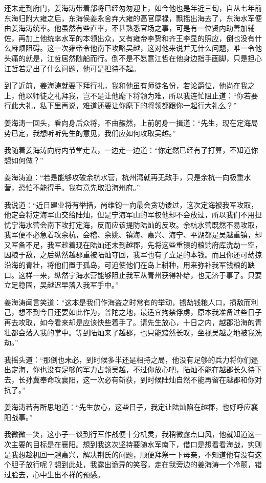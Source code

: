 还未走到府门，姜海涛带着部将已经匆匆迎上，如今他也是年近三旬，自从七年前东海归附大雍之后，东海侯姜永舍弃大雍的高官厚禄，飘摇出海去了，东海水军便由姜海涛统率。他虽然有些直率，不甚熟悉官场之事，可是有一位贤内助善加辅佐，再加上他统率水军的本领出众，又有雍帝李贽和齐王李显的照应，倒也没有什么麻烦阻碍。这一次雍帝令他南下攻略吴越，这对他来说并无什么问题，唯一令他头痛的就是，江哲居然随船而行。倒不是不愿意江哲在他身边指手画脚，只是担心江哲若是出了什么问题，他可是担待不起。

到了近前，姜海涛就要下拜行礼，我和他虽有师徒名份，若论爵位，他尚在我之上，他以师徒之礼拜我，岂不是让他麾下将领为难，所以我连忙阻止道：“你若要行此大礼，私下里再说，难道还要让你麾下的将领都跟你一起行大礼么？”

姜海涛一回头，看向身后众将，不由赧然，上前躬身一揖道：“先生，现在定海局势已定，我想听听先生的意见，我们应如何攻取吴越。”

我随着姜海涛向府内节堂走去，一边走一边道：“你定然已经有了打算，不知道你想如何做？”

姜海涛道：“若是能够攻破余杭水营，杭州湾就再无敌手，只是余杭一向极重水营，恐怕不能得手。我有意先取沿海州府。”

我说道：“近日建业将有举措，尚维钧一向最会贪功诿过，这次定海被我军攻取，他定会将定海军山交给陆灿，但是宁海军山的军权他却不会放过，所以我们不用担忧宁海水营会南下攻打定海，反而应该提防陆灿的反攻。余杭水营既然不易攻取，我军便不必急着攻余杭，会稽、余姚、镇海、嘉兴、海宁、平湖都是吴越重镇，却又军备不足，我军趁着现在陆灿还未到越郡，先将这些重镇的粮饷府库洗劫一空，因粮于敌，之后纵然越郡重被陆灿夺回，我军也有了立足的本钱。而且你还可劫掠沿海的青壮，将他们置于孤岛，可迫使他们在岛上耕种，用来弥补我军钱粮的缺口。这样一来，纵然宁海水营能够阻止我军从青州获得补给，也无济于事了。只要立足稳固，吴越迟早落入我军手中。”

姜海涛闻言笑道：“这本是我们作海盗之时常有的举动，掳劫钱粮人口，损敌而利己，想不到今日还要如此作为，普陀之地，最适宜拘禁俘虏，原本我准备过些日子再去攻取，如今看来却是应该快些着手了。请先生放心，十日之内，越郡沿海的青壮都会落入我的掌中。等到陆灿来了越郡，也只能黯然长叹，坐视吴越之地被我洗劫。”

我摇头道：“那倒也未必，到时候多半还是相持之局，他没有足够的兵力将你们逐出定海，你也没有足够的军力占领吴越，不过你放心吧，陆灿不能在越郡长久待下去，长孙冀奉命攻襄阳，这一次必有斩获，到时候陆灿自然不能再留在越郡和你对抗了。”

姜海涛若有所思地道：“先生放心，这些日子，我定让陆灿陷在越郡，也好呼应襄阳战事。”

我微微一笑，这小子一谈到行军作战便十分机灵，我稍微露点口风，他就知道这一次主要的目标是在襄阳。想到我这次坚持要随水军南下，借口是想看看海战，实则是我想趁机回一趟嘉兴，解决荆氏的问题，顺便拜祭一下母亲，不知道他有没有这个胆子放行呢？想到此处，我露出诡异的笑容，走在我旁边的姜海涛一个冷颤，错过脸去，心中生出不祥的预感。

